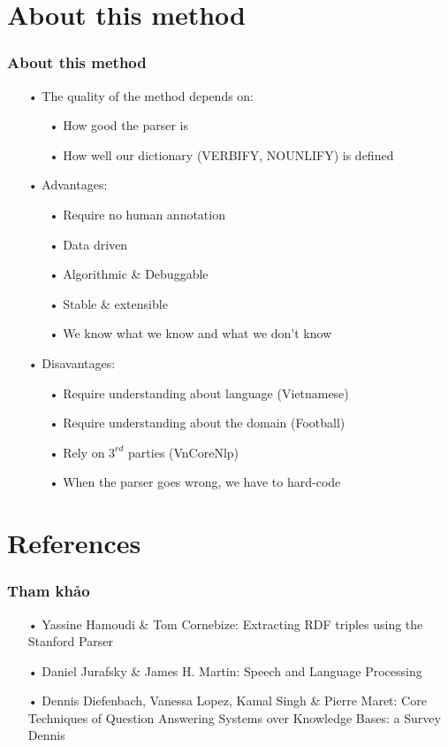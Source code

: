 \documentclass{beamer}
\begin{document}
\section{About this method}
\begin{frame}
	\frametitle{About this method}
	
	\begin{itemize}
	
		\item[•] The quality of the method depends on:
		\begin{itemize}
			\item[•] How good the parser is
			\item[•] How well our dictionary (VERBIFY, NOUNLIFY) is defined
		\end{itemize}
		\item[•] Advantages:
		\begin{itemize}
			\item[•] Require no human annotation
			\item[•] Data driven
			\item[•] Algorithmic \& Debuggable
			\item[•] Stable \& extensible	
			\item[•] We know what we know and what we don't know
		\end{itemize}
		
		\item[•] Disavantages:
		\begin{itemize}
			\item[•] Require understanding about language (Vietnamese)
			\item[•] Require understanding about the domain (Football)
			\item[•] Rely on $3^{rd}$ parties (VnCoreNlp)
			\item[•] When the parser goes wrong, we have to hard-code
		\end{itemize}
		
	\end{itemize}	
	
\end{frame}

	
\section{References}
\begin{frame}
	\frametitle{Tham khảo}
	
	\begin{itemize}
	
	\item[•] Yassine Hamoudi \& Tom Cornebize: Extracting RDF triples using the Stanford Parser
	
	\item[•] Daniel Jurafsky \& James H. Martin: Speech and Language Processing
	
	\item[•] Dennis Diefenbach, Vanessa Lopez, Kamal Singh \& Pierre Maret: Core Techniques of Question Answering Systems over Knowledge Bases: a Survey
Dennis 	
	
	\end{itemize}		
	
\end{frame}
	
	
	
	
	
	
	
\end{document}
